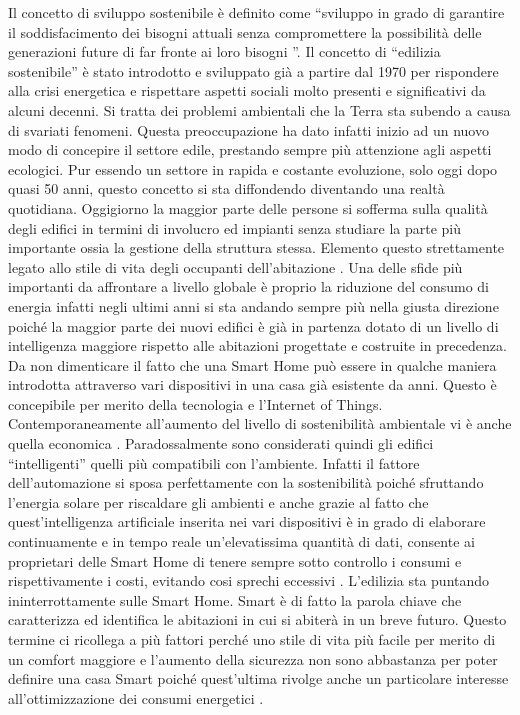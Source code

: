 Il concetto di sviluppo sostenibile è definito come “sviluppo in grado di garantire il soddisfacimento dei bisogni attuali senza compromettere la possibilità delle generazioni future di far fronte ai loro bisogni ”.
Il concetto di “edilizia sostenibile” è stato introdotto e sviluppato già a partire dal 1970 per rispondere alla crisi energetica e rispettare aspetti sociali molto presenti e significativi da alcuni decenni. Si tratta dei problemi ambientali che la Terra sta subendo a causa di svariati fenomeni. Questa preoccupazione ha dato infatti inizio ad un nuovo modo di concepire il settore edile, prestando sempre più attenzione agli aspetti ecologici. Pur essendo un settore in rapida e costante evoluzione, solo oggi dopo quasi 50 anni, questo concetto si sta diffondendo diventando una realtà quotidiana. 
Oggigiorno la maggior parte delle persone si sofferma sulla qualità degli edifici in termini di involucro ed impianti senza studiare la parte più importante ossia la gestione della struttura stessa. Elemento questo strettamente legato allo stile di vita degli occupanti dell’abitazione .
Una delle sfide più importanti da affrontare a livello globale è proprio la riduzione del consumo di energia infatti negli ultimi anni si sta andando sempre più nella giusta direzione poiché la maggior parte dei nuovi edifici è già in partenza dotato di un livello di intelligenza maggiore rispetto alle abitazioni progettate e costruite in precedenza. Da non dimenticare il fatto che una Smart Home può essere in qualche maniera introdotta attraverso vari dispositivi in una casa già esistente da anni. Questo è concepibile per merito della tecnologia e l’Internet of Things.
Contemporaneamente all’aumento del livello di sostenibilità ambientale vi è anche quella economica .
Paradossalmente sono considerati quindi gli edifici “intelligenti” quelli più compatibili con l’ambiente.
Infatti il fattore dell’automazione si sposa perfettamente con la sostenibilità poiché sfruttando l’energia solare per riscaldare gli ambienti e anche grazie al fatto che quest’intelligenza artificiale inserita nei vari dispositivi è in grado di elaborare continuamente e in tempo reale un’elevatissima quantità di dati, consente ai proprietari delle Smart Home di tenere sempre sotto controllo i consumi e rispettivamente i costi, evitando cosi sprechi eccessivi .
L’edilizia sta puntando ininterrottamente sulle Smart Home. Smart è di fatto la parola chiave che caratterizza ed identifica le abitazioni in cui si abiterà in un breve futuro. Questo termine ci ricollega a più fattori perché uno stile di vita più facile per merito di un comfort maggiore e l’aumento della sicurezza non sono abbastanza per poter definire una casa Smart poiché quest’ultima rivolge anche un particolare interesse all’ottimizzazione dei consumi energetici .
